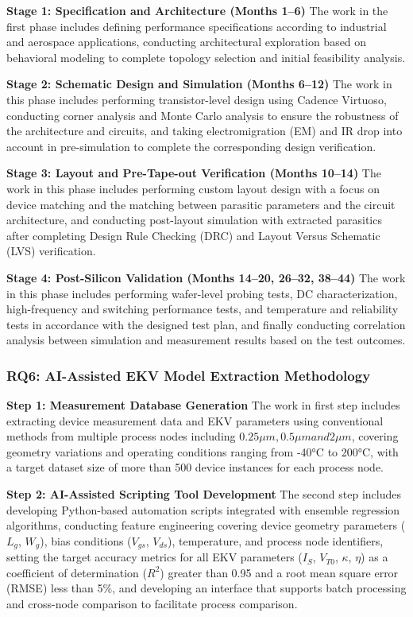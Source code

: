 \documentclass[12pt,a4paper]{article}
\begin{document}
\textbf{Stage 1: Specification and Architecture (Months 1--6)}
The work in the first phase includes defining performance specifications according to industrial and aerospace applications, conducting architectural exploration based on behavioral modeling to complete topology selection and initial feasibility analysis.


\textbf{Stage 2: Schematic Design and Simulation (Months 6--12)}
The work in this phase includes performing transistor-level design using Cadence Virtuoso, conducting corner analysis and Monte Carlo analysis to ensure the robustness of the architecture and circuits, and taking electromigration (EM) and IR drop into account in pre-simulation to complete the corresponding design verification.


\textbf{Stage 3: Layout and Pre-Tape-out Verification (Months 10--14)}
The work in this phase includes performing custom layout design with a focus on device matching and the matching between parasitic parameters and the circuit architecture, and conducting post-layout simulation with extracted parasitics after completing Design Rule Checking (DRC) and Layout Versus Schematic (LVS) verification.

\textbf{Stage 4: Post-Silicon Validation (Months 14--20, 26--32, 38--44)}
The work in this phase includes performing wafer-level probing tests, DC characterization, high-frequency and switching performance tests, and temperature and reliability tests in accordance with the designed test plan, and finally conducting correlation analysis between simulation and measurement results based on the test outcomes.


\subsubsection{RQ6: AI-Assisted EKV Model Extraction Methodology}

\textbf{Step 1: Measurement Database Generation}
The work in first step includes extracting device measurement data and EKV parameters using conventional methods from multiple process nodes including $0.25\mu m, 0.5\mu m and 2\mu m$, covering geometry variations and operating conditions ranging from -40°C to 200°C, with a target dataset size of more than 500 device instances for each process node.


\textbf{Step 2: AI-Assisted Scripting Tool Development}
The second step includes developing Python-based automation scripts integrated with ensemble regression algorithms, conducting feature engineering covering device geometry parameters ($L_g$, $W_g$), bias conditions ($V_{gs}$, $V_{ds}$), temperature, and process node identifiers, setting the target accuracy metrics for all EKV parameters ($I_S$, $V_{T0}$, $\kappa$, $\eta$) as a coefficient of determination ($R^2$) greater than 0.95 and a root mean square error (RMSE) less than 5\%, and developing an interface that supports batch processing and cross-node comparison to facilitate process comparison.
\end{document}
